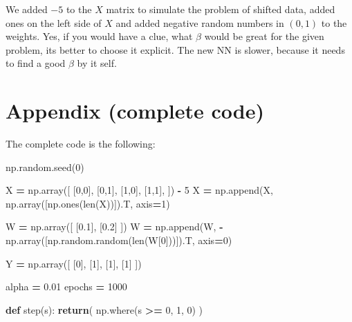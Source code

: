 \documentclass[
]{book}
\newenvironment{Shaded}{\begin{snugshade}}{\end{snugshade}}
\newcommand{\BuiltInTok}[1]{#1}
\newcommand{\ControlFlowTok}[1]{\textcolor[rgb]{0.13,0.29,0.53}{\textbf{#1}}}
\newcommand{\DecValTok}[1]{\textcolor[rgb]{0.00,0.00,0.81}{#1}}
\newcommand{\FloatTok}[1]{\textcolor[rgb]{0.00,0.00,0.81}{#1}}
\newcommand{\KeywordTok}[1]{\textcolor[rgb]{0.13,0.29,0.53}{\textbf{#1}}}
\newcommand{\NormalTok}[1]{#1}
\newcommand{\OperatorTok}[1]{\textcolor[rgb]{0.81,0.36,0.00}{\textbf{#1}}}
\begin{document}
We added \(-5\) to the \(X\) matrix to simulate the problem of shifted data, added ones on the left side of \(X\) and added negative random numbers in \((0,1)\) to the weights. Yes, if you would have a clue, what \(\beta\) would be great for the given problem, its better to choose it explicit. The new NN is slower, because it needs to find a good \(\beta\) by it self.

\hypertarget{appendix-complete-code-1}{%
\section{Appendix (complete code)}\label{appendix-complete-code-1}}

The complete code is the following:

\begin{Shaded}
\begin{Highlighting}[]
\NormalTok{np.random.seed(}\DecValTok{0}\NormalTok{)}

\NormalTok{X }\OperatorTok{=}\NormalTok{ np.array([}
\NormalTok{  [}\DecValTok{0}\NormalTok{,}\DecValTok{0}\NormalTok{],}
\NormalTok{  [}\DecValTok{0}\NormalTok{,}\DecValTok{1}\NormalTok{],}
\NormalTok{  [}\DecValTok{1}\NormalTok{,}\DecValTok{0}\NormalTok{],}
\NormalTok{  [}\DecValTok{1}\NormalTok{,}\DecValTok{1}\NormalTok{],}
\NormalTok{]) }\OperatorTok{{-}} \DecValTok{5}
\NormalTok{X }\OperatorTok{=}\NormalTok{ np.append(X, np.array([np.ones(}\BuiltInTok{len}\NormalTok{(X))]).T, axis}\OperatorTok{=}\DecValTok{1}\NormalTok{)}

\NormalTok{W }\OperatorTok{=}\NormalTok{ np.array([}
\NormalTok{  [}\FloatTok{0.1}\NormalTok{], }
\NormalTok{  [}\FloatTok{0.2}\NormalTok{]}
\NormalTok{])}
\NormalTok{W }\OperatorTok{=}\NormalTok{ np.append(W, }\OperatorTok{{-}}\NormalTok{np.array([np.random.random(}\BuiltInTok{len}\NormalTok{(W[}\DecValTok{0}\NormalTok{]))]).T, axis}\OperatorTok{=}\DecValTok{0}\NormalTok{)}

\NormalTok{Y }\OperatorTok{=}\NormalTok{ np.array([}
\NormalTok{  [}\DecValTok{0}\NormalTok{],}
\NormalTok{  [}\DecValTok{1}\NormalTok{],}
\NormalTok{  [}\DecValTok{1}\NormalTok{],}
\NormalTok{  [}\DecValTok{1}\NormalTok{]}
\NormalTok{])}

\NormalTok{alpha }\OperatorTok{=} \FloatTok{0.01}
\NormalTok{epochs }\OperatorTok{=} \DecValTok{1000}

\KeywordTok{def}\NormalTok{ step(s):}
  \ControlFlowTok{return}\NormalTok{( np.where(s }\OperatorTok{\textgreater{}=} \DecValTok{0}\NormalTok{, }\DecValTok{1}\NormalTok{, }\DecValTok{0}\NormalTok{) )}



\end{Highlighting}
\end{Shaded}
\end{document}
